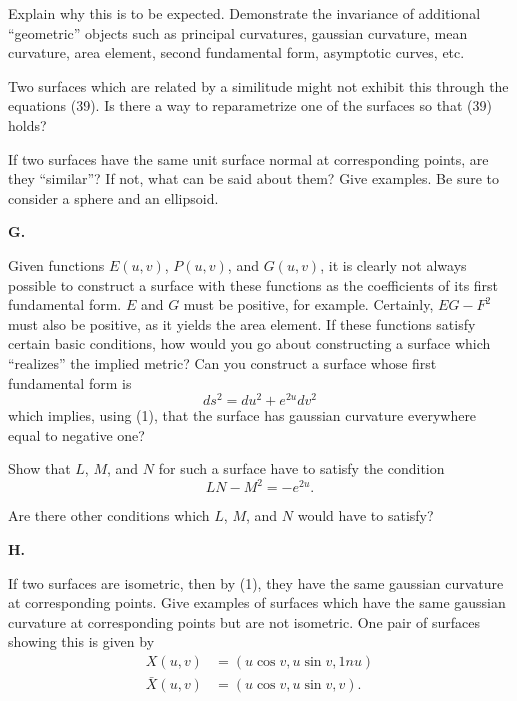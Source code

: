 \documentclass{book}
\begin{document}
Explain why this is to be expected. Demonstrate the invariance of additional ``geometric'' objects such as principal curvatures, gaussian curvature, mean curvature, area element, second fundamental form, asymptotic curves, etc.

Two surfaces which are related by a similitude might not exhibit this through the equations (39). Is there a way to reparametrize one of the surfaces so that (39) holds?

If two surfaces have the same unit surface normal at corresponding points, are they ``similar''? If not, what can be said about them? Give examples. Be sure to consider a sphere and an ellipsoid.

\vspace{0.3cm}

\noindent \textbf{G.}

\vspace{0.3cm}

Given functions $E(u,v)$, $P(u,v)$, and $G(u,v)$, it is clearly not always possible to construct a surface with these functions as the coefficients of its first fundamental form. $E$ and $G$ must be positive, for example. Certainly, $EG - F^{2}$ must also be positive, as it yields the area element. If these functions satisfy certain basic conditions, how would you go about constructing a surface which ``realizes'' the implied metric? Can you construct a surface whose first fundamental form is
\begin{equation}
ds^{2} = du^{2} + e^{2u} dv^{2}
\end{equation}
which implies, using (1), that the surface has gaussian curvature everywhere equal to negative one?

Show that $L$, $M$, and $N$ for such a surface have to satisfy the condition
\begin{equation}
LN - M^{2} = - e^{2u}.
\end{equation}

Are there other conditions which $L$, $M$, and $N$ would have to satisfy?

\vspace{0.3cm}

\noindent \textbf{H.}

\vspace{0.3cm}

If two surfaces are isometric, then by (1), they have the same gaussian curvature at corresponding points. Give examples of surfaces which have the same gaussian curvature at corresponding points but are not isometric. One pair of surfaces showing this is given by
\begin{align}
X(u,v) & = (u \cos v, u \sin v, 1 n u) \\
\bar{X}(u,v) & = (u \cos v, u \sin v, v).
\end{align}
\end{document}
